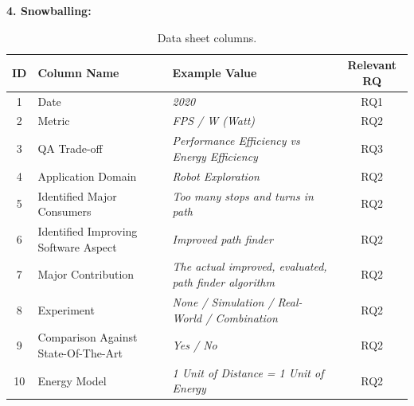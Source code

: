 \noindent\textbf{4. Snowballing:}
\begin{table}[t]
    \centering
    \caption{Data sheet columns.}
    \begin{tabular}{cllc}
        \toprule
            ID &
            Column Name & 
            Example Value & 
            Relevant RQ  \\
        \midrule
            1 &
               Date & 
                \textit{2020} & 
                RQ1 \\

            2 &
                Metric & 
                \textit{FPS / W (Watt)} & 
                RQ2 \\

            3 &
                QA Trade-off & 
                \textit{Performance Efficiency vs Energy Efficiency} & 
                RQ3 \\
                
            4 &
                Application Domain & 
                \textit{Robot Exploration} & 
                RQ2 \\

            5 & 
                Identified Major Consumers & 
                \textit{Too many stops and turns in path} & 
                RQ2 \\

            6 & 
                Identified Improving Software Aspect & 
                \textit{Improved path finder} & 
                RQ2 \\
            
            7 &
                Major Contribution & 
                \textit{The actual improved, evaluated, path finder algorithm} & 
                RQ2 \\
            
            8 &
                Experiment & 
                \textit{None / Simulation / Real-World / Combination} & 
                RQ2 \\
            
            9 &
                Comparison Against State-Of-The-Art & 
                \textit{Yes / No} & 
                RQ2 \\
            
            10 &
                Energy Model &
                \textit{1 Unit of Distance = 1 Unit of Energy} & 
                RQ2 \\
        \bottomrule
    \end{tabular}
    \label{table:data_sheet}
\end{table}
